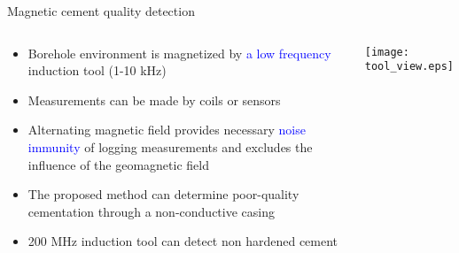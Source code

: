 \documentclass[aspectratio=169]{beamer}
\begin{document}
\begin{frame}{Magnetic cement quality detection}

\begin{columns}[c] 

\begin{block}{}
\begin{itemize}
	\item Borehole environment is magnetized  by \textcolor{blue} {a low frequency} induction tool (1-10 kHz)
	\item Measurements can be made by coils or sensors 
	\item Alternating magnetic field provides necessary  \textcolor{blue} {noise immunity} of logging measurements and excludes the influence of the geomagnetic field
	\item The proposed method can determine poor-quality cementation through a non-conductive casing
	\item 200 MHz induction tool can detect non hardened cement 
\end{itemize}
\end{block}

\texttt{[image: tool\_view.eps]}
\end{columns}


\end{frame}
\end{document}
